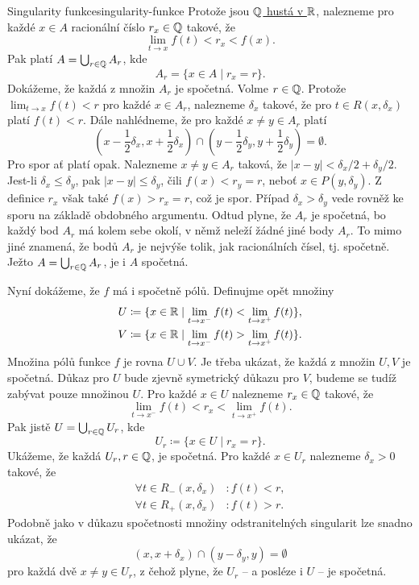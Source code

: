 \begin{example}{Singularity funkce}{singularity-funkce}
 Protože jsou \hyperref[prop:hustota-q-v-r]{$\mathbb{Q}$ hustá v $\mathbb{R}$}, nalezneme pro
 každé $x \in A$ racionální číslo $r_x \in \mathbb{Q}$ takové, že
 \[
  \lim_{t \to x} f(t) < r_x < f(x).
 \]
 Pak platí $A = \bigcup_{r \in \mathbb{Q}} A_r$, kde
 \[
  A_r = \{x \in A \mid r_x = r\}.
 \]
 Dokážeme, že každá z množin $A_r$ je spočetná. Volme $r \in \mathbb{Q}$. Protože
 $\lim_{t \to x} f(t) < r$ pro každé $x \in A_r$, nalezneme $\delta_x$ takové,
 že pro $t \in R(x,\delta_x)$ platí $f(t) < r$. Dále nahlédneme, že pro každé
 $x \neq y \in A_r$ platí
 \[
  (x - \frac{1}{2}\delta_x, x + \frac{1}{2}\delta_x) \cap
  (y-\frac{1}{2}\delta_y,y+\frac{1}{2}\delta_y) = \emptyset.
 \]
 Pro spor ať platí opak. Nalezneme $x \neq y \in A_r$ taková, že $|x-y|<\delta_x
 / 2 + \delta_y / 2$. Jest-li $\delta_x \leq \delta_y$, pak $|x-y| \leq
 \delta_y$, čili $f(x) < r_y = r$, neboť $x \in P(y,\delta_y)$. Z definice $r_x$
 však také $f(x) > r_x = r$, což je spor. Případ $\delta_x > \delta_y$ vede
 rovněž ke sporu na základě obdobného argumentu. Odtud plyne, že $A_r$ je
 spočetná, bo každý bod $A_r$ má kolem sebe okolí, v němž neleží žádné jiné body
 $A_r$. To mimo jiné znamená, že bodů $A_r$ je nejvýše tolik, jak racionálních
 čísel, tj. spočetně. Ježto $A = \bigcup_{r \in \mathbb{Q}} A_r$, je i $A$ spočetná.

 Nyní dokážeme, že $f$ má i spočetně pólů. Definujme opět množiny
 \begin{align*}
  U &\coloneqq \{x \in \mathbb{R} \mid \lim_{t \to x^{-}} f(t) < \lim_{t \to x^{+}}
  f(t)\},\\
   V &\coloneqq \{x \in \mathbb{R} \mid \lim_{t \to x^{-}} f(t) > \lim_{t \to x^{+}}
   f(t)\}.
 \end{align*}
 Množina pólů funkce $f$ je rovna $U \cup V$. Je třeba ukázat, že každá z množin
 $U,V$ je spočetná. Důkaz pro $U$ bude zjevně symetrický důkazu pro $V$, budeme
 se tudíž zabývat pouze množinou $U$. Pro každé $x \in U$ nalezneme $r_x \in \mathbb{Q}$
 takové, že
 \[
  \lim_{t \to x^{-}} f(t) < r_x < \lim_{t \to x^{+}} f(t).
 \]
 Pak jistě $U = \bigcup_{r \in \mathbb{Q}} U_r$, kde
 \[
  U_r \coloneqq \{x \in U \mid r_x = r\}.
 \]
 Ukážeme, že každá $U_r,r \in \mathbb{Q}$, je spočetná. Pro každé $x \in U_r$ nalezneme
 $\delta_x>0$ takové, že
 \begin{align*}
  \forall t \in R_-(x,\delta_x)&: f(t) < r,\\
  \forall t \in R_+(x,\delta_x)&:f(t) > r.
 \end{align*}
 Podobně jako v důkazu spočetnosti množiny odstranitelných singularit lze snadno
 ukázat, že
 \[
  (x,x+\delta_x) \cap (y-\delta_y,y) = \emptyset
 \]
 pro každá dvě $x \neq y \in U_r$, z čehož plyne, že $U_r$ -- a posléze i $U$ --
 je spočetná.
\end{example}
